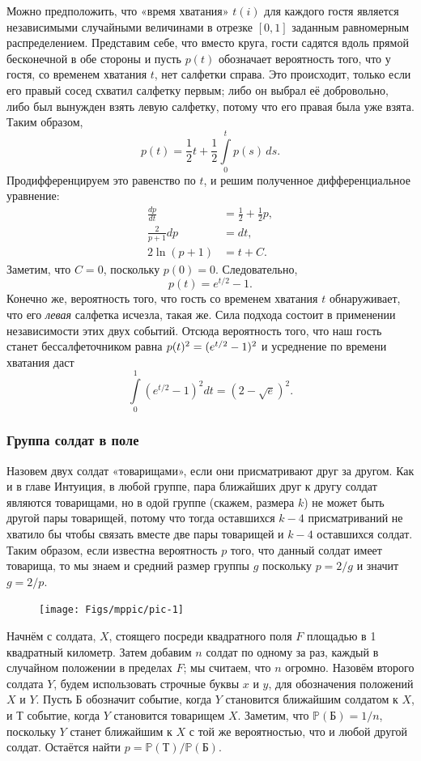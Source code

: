 Можно предположить, что «время хватания» $t(i)$ для каждого гостя является независимыми случайными величинами в отрезке $[0,1]$ заданным равномерным распределением.
Представим себе, что вместо круга, гости садятся вдоль прямой бесконечной в обе стороны и пусть $p(t)$ обозначает вероятность того, что у гостя, со временем хватания $t$, нет салфетки справа.
Это происходит, только если его правый сосед схватил салфетку первым;
либо он выбрал её добровольно,
либо был вынужден взять левую салфетку, потому что его правая была уже взята.
Таким образом,
\[p(t)=\frac12t+\frac12\int\limits_0^tp(s)\,ds.\]
Продифференцируем это равенство по $t$, и решим полученное дифференциальное уравнение:
\begin{align*}
\frac{dp}{dt}&=\frac12+\frac12p,
\\
\frac2{p+1}dp&=dt,
\\
2\ln(p+1)&=t+C.
\end{align*}
Заметим, что $C=0$, поскольку $p(0)=0$.
Следовательно,
\[p(t) = e^{t/2} - 1.\]
Конечно же, вероятность того, что гость со временем хватания $t$ обнаруживает, что его \emph{левая} салфетка исчезла, такая же.
Сила подхода состоит в применении независимости этих двух событий.
Отсюда вероятность того, что наш гость станет бессалфеточником равна $p(t)^2 \z= (e^{t/2} -1)^2$ и усреднение по времени хватания даст
\[\int\limits_0^1(e^{t/2}-1)^2dt=(2-\sqrt{e})^2.\]
\heart

\subsubsection*{Группа солдат в поле}

Назовем двух солдат «товарищами», если они присматривают друг за другом.
Как и в главе Интуиция, в любой группе, пара ближайших друг к другу солдат являются товарищами, но в одой группе (скажем, размера $k$) не может быть другой пары товарищей, потому что тогда оставшихся $k-4$ присматриваний не хватило бы чтобы связать вместе две пары товарищей и $k-4$ оставшихся солдат.
Таким образом, если известна вероятность $p$ того, что данный солдат имеет товарища, то мы знаем и средний размер группы $g$ поскольку $p = 2/g$ и значит $g = 2/p$.

\begin{figure}[h!]
\centering
\texttt{[image: Figs/mppic/pic-1]}
\end{figure}

Начнём с солдата, $X$, стоящего посреди квадратного поля $F$ площадью в 1 квадратный километр.
Затем добавим $n$ солдат по одному за раз, каждый в случайном положении в пределах $F$; мы считаем, что $n$ огромно.
Назовём второго солдата $Y$, будем использовать строчные буквы $x$ и $y$, для обозначения положений $X$ и $Y$.
Пусть $\text{Б}$ обозначит событие, когда $Y$ становится ближайшим солдатом к $X$, 
и $\text{Т}$ событие, когда $Y$ становится товарищем $X$.
Заметим, что $\mathbb{P}(\text{Б})=1/n$, поскольку $Y$ станет ближайшим к $X$ с той же вероятностью, что и любой другой солдат.
Остаётся найти $p=\mathbb{P}(\text{Т})/\mathbb{P}(\text{Б})$.

